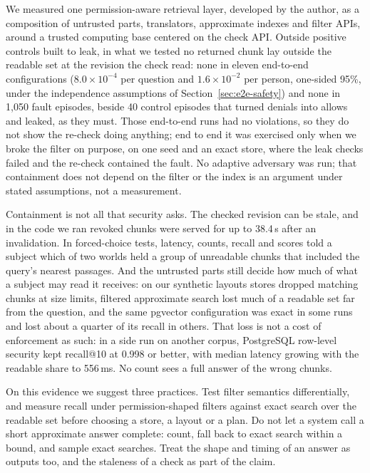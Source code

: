 
We measured one permission-aware retrieval layer, developed by the author, as a composition of untrusted parts, translators, approximate indexes and filter APIs, around a
trusted computing base centered on the check API. Outside positive controls built to leak, in what we tested no returned chunk lay outside the readable set at the revision the check read: none in eleven end-to-end
configurations ($8.0 \times 10^{-4}$ per question and $1.6 \times 10^{-2}$ per person, one-sided 95\%, under the independence assumptions of Section~\ref{sec:e2e-safety}) and none in 1,050 fault episodes, beside 40 control episodes that turned denials into allows and leaked, as they must. Those end-to-end runs had no violations, so they do not show the re-check doing anything; end to end it was exercised only when we broke the filter on purpose, on one seed and an exact store, where the leak checks failed and the re-check contained the fault. No adaptive adversary was run; that containment does not depend on the filter or the index is an argument under stated assumptions, not a measurement.

Containment is not all that security asks. The checked revision can be stale, and in the code we ran revoked chunks were served for up to 38.4\,s after an invalidation. In forced-choice tests, latency, counts, recall and scores
told a subject which of two worlds held a group of unreadable chunks that included the query's nearest passages. And the untrusted parts still decide how much of what a subject may
read it receives: on our synthetic layouts stores dropped matching chunks at size limits, filtered approximate search lost much of a readable set far from the
question, and the same pgvector configuration was exact in some runs and lost about a quarter of its recall in others. That loss is not a cost of enforcement as such: in a side run on another corpus, PostgreSQL row-level security kept recall@10 at 0.998 or better, with median latency growing with the readable share to 556\,ms. No count sees a full answer
of the wrong chunks.

On this evidence we suggest three practices. Test filter semantics differentially, and measure recall under permission-shaped filters against exact search over the
readable set before choosing a store, a layout or a plan. Do not let a system call a short approximate answer complete: count, fall back to exact
search within a bound, and sample exact searches. Treat the shape and timing of an answer as outputs too, and the
staleness of a check as part of the claim.
